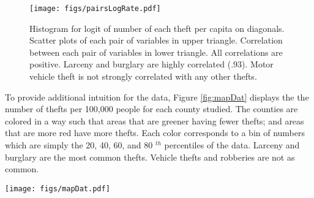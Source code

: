 \documentclass{../../tex_template/asaproc}
\begin{document}
\begin{figure}[H]
  \texttt{[image: figs/pairsLogRate.pdf]}
  \caption{\small Histogram for logit of number of each theft per capita on diagonals. Scatter plots
  of each pair of variables in upper triangle. Correlation between each pair of variables in
  lower triangle. All correlations are positive. Larceny and burglary are highly correlated (.93). 
  Motor vehicle theft is not strongly correlated with any other thefts.}
  \label{fig:logOdds}
\end{figure}

To provide additional intuition for the data, Figure \ref{fig:mapDat} displays the 
the number of thefts per 100,000 people for each county studied. The counties are 
colored in a way such that areas that are greener having fewer thefts; and areas
that are more red have more thefts. Each color corresponds to a bin of numbers
which are simply the 20, 40, 60, and 80 $^{th}$ percentiles of the data.
Larceny and burglary are the most common thefts. Vehicle thefts and robberies
are not as common. 

\begin{figure*}
  \centering
  \texttt{[image: figs/mapDat.pdf]}
  \vspace{-7em}
  \caption{\small Map of California thefts per 100,000 people for a selection of
  counties. The left-most plot shows the number of thefts per 100,000 people for
  each of the counties. The color code shows that greener areas have fewer
  robberies (safer) and redder areas have more robberies (more dangerous). The
  different color bins also represent the 20, 40, 60, and 80$^{th}$ percentile
  cut-offs.}
  \label{fig:mapDat}
\end{figure*}
\end{document}

